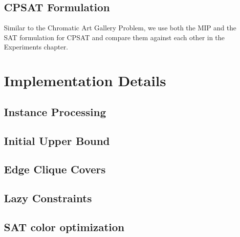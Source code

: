 \section{CPSAT Formulation}
Similar to the Chromatic Art Gallery Problem, we use both the MIP and the SAT formulation for CPSAT and compare them against each other in the Experiments chapter.

\chapter{Implementation Details}

\section{Instance Processing}

\section{Initial Upper Bound}

\section{Edge Clique Covers}

\section{Lazy Constraints}

\section{SAT color optimization}